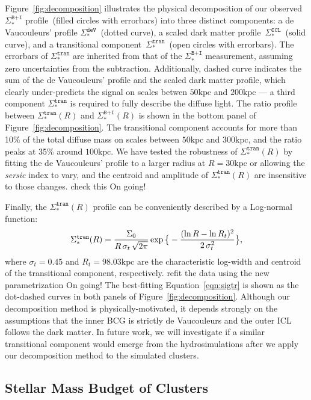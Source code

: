 \documentclass[fleqn,usenatbib]{mnras}
\newcommand{\sigbi}{\Sigma_*^{\texttt{B+I}}}
\newcommand{\sigdev}{\Sigma_*^{\texttt{deV}}}
\newcommand{\sigtr}{\Sigma_*^{\texttt{tran}}}
\newcommand{\sigicl}{\Sigma_*^{\texttt{ICL}}}
\newcommand{\kpc}{\mathrm{kpc}}
\newcommand\ying[1]{{\color{red} {#1}}}
\newcommand\xkchen[1]{{\color{cyan} {#1}}}
\begin{document}
Figure~\ref{fig:decomposition} illustrates the physical decomposition of
our observed $\sigbi$ profile~(filled circles with errorbars) into three
distinct components: a de Vaucouleurs' profile $\sigdev$~(dotted curve), a
scaled dark matter profile~$\sigicl$~(solid curve), and a transitional
component~$\sigtr$~(open circles with errorbars).  The errorbars of
$\sigtr$ are inherited from that of the $\sigbi$ measurement, assuming zero
uncertainties from the subtraction. Additionally, dashed curve indicates
the sum of the de Vaucouleurs' profile and the scaled dark matter profile,
which clearly under-predicts the signal on scales betwen $50\kpc$ and
$200\kpc$ --- a third component $\sigtr$ is required to fully describe the
diffuse light.  The ratio profile between $\sigtr(R)$ and $\sigbi(R)$ is
shown in the bottom panel of Figure~\ref{fig:decomposition}. The
transitional component accounts for more than 10\% of the total diffuse
mass on scales between $50\kpc$ and $300\kpc$, and the ratio peaks
at 35\% around $100\kpc$.
We have tested the robustness of $\sigtr(R)$ by fitting the de Vaucouleurs'
profile to a larger radius at $R=30\kpc$ or allowing the {\it sersic} index
to vary, and the centroid and amplitude of $\sigtr(R)$ are insensitive to
those changes. \ying{check this} \xkchen{On going!}


Finally, the $\sigtr(R)$ profile can be conveniently described by a
Log-normal function:
\begin{equation}
    \sigtr(R) =  \frac{\Sigma_{0}}{R \, \sigma_t \,
    \sqrt{2 \pi} } \exp \big{ \{ } - \frac{(\ln R - \ln R_t)^2} {2
    \, \sigma_t^2} \big{ \} },
    \label{eqn:sigtr}
\end{equation}
where \xkchen{$\sigma_t{=}0.45$} and \xkchen{$R_t{=}98.03\kpc$} are the characteristic log-width
and centroid of the transitional component, respectively.\ying{refit the
data using the new parametrization} \xkchen{On going!} The best-fitting
Equation~\ref{eqn:sigtr} is shown as the dot-dashed curves in both panels
of Figure~\ref{fig:decomposition}. Although our decomposition method is
physically-motivated, it depends strongly on the assumptions that the inner
BCG is strictly de Vaucouleurs and the outer ICL follows the dark matter.
In future work, we will investigate if a similar transitional component
would emerge from the hydrosimulations after we apply our decomposition
method to the simulated clusters.


\subsection{Stellar Mass Budget of Clusters}
\label{subsec:budget}
\end{document}
